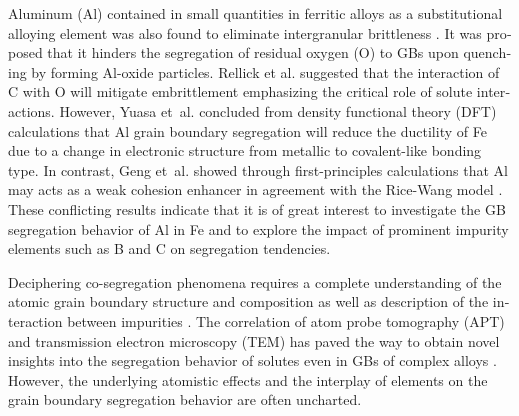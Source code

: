 \documentclass[12pt,a4paper,twoside,twocolumn,english,english]{article}
\begin{document}
\begin{otherlanguage}{english}
Aluminum (Al) contained in small quantities in ferritic alloys as a substitutional alloying element was also found to eliminate intergranular brittleness \cite{rellick_elimination_1970}. It was proposed that it hinders the segregation of residual oxygen (O) to GBs upon quenching by forming Al-oxide particles. Rellick et al. \cite{rellick_elimination_1970} suggested that the interaction of C with O will mitigate embrittlement emphasizing the critical role of solute interactions. However, Yuasa et~al. \cite{yuasa_first-principles_2013} concluded from density functional theory (DFT) calculations that Al grain boundary segregation will reduce the ductility of Fe due to a change in electronic structure from metallic to covalent-like bonding type. In contrast, Geng et~al. \cite{geng_influence_2001} showed through first-principles calculations that Al may acts as a weak cohesion enhancer in agreement with the Rice-Wang model \cite{rice_embrittlement_1989}. These conflicting results indicate that it is of great interest to investigate the GB segregation behavior of Al in Fe and to explore the impact of prominent impurity elements such as B and C on segregation tendencies. 

Deciphering co-segregation phenomena requires a complete understanding of the atomic grain boundary structure and composition as well as description of the interaction between impurities \cite{guttmann_equilibrium_1975,lejcek_grain_2010}. The correlation of atom probe tomography (APT) and transmission electron microscopy (TEM) has paved the way to obtain novel insights into the segregation behavior of solutes even in GBs of complex alloys \cite{raabe_grain_2014}. However, the underlying atomistic effects and the interplay of elements on the grain boundary segregation behavior are often uncharted.



\end{otherlanguage}
\end{document}
